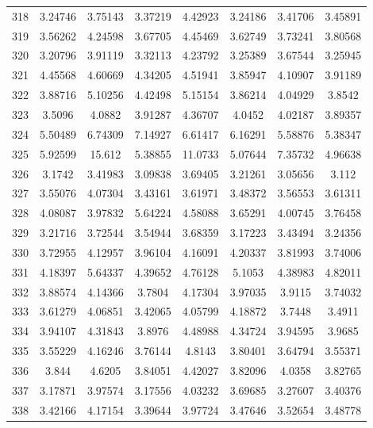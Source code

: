 \begin{center}
\begin{longtable}{cccccccc}
318 & 3.24746 & 3.75143 & 3.37219 & 4.42923 & 3.24186 & 3.41706 & 3.45891\\
319 & 3.56262 & 4.24598 & 3.67705 & 4.45469 & 3.62749 & 3.73241 & 3.80568\\
320 & 3.20796 & 3.91119 & 3.32113 & 4.23792 & 3.25389 & 3.67544 & 3.25945\\
321 & 4.45568 & 4.60669 & 4.34205 & 4.51941 & 3.85947 & 4.10907 & 3.91189\\
322 & 3.88716 & 5.10256 & 4.42498 & 5.15154 & 3.86214 & 4.04929 & 3.8542\\
323 & 3.5096 & 4.0882 & 3.91287 & 4.36707 & 4.0452 & 4.02187 & 3.89357\\
324 & 5.50489 & 6.74309 & 7.14927 & 6.61417 & 6.16291 & 5.58876 & 5.38347\\
325 & 5.92599 & 15.612 & 5.38855 & 11.0733 & 5.07644 & 7.35732 & 4.96638\\
326 & 3.1742 & 3.41983 & 3.09838 & 3.69405 & 3.21261 & 3.05656 & 3.112\\
327 & 3.55076 & 4.07304 & 3.43161 & 3.61971 & 3.48372 & 3.56553 & 3.61311\\
328 & 4.08087 & 3.97832 & 5.64224 & 4.58088 & 3.65291 & 4.00745 & 3.76458\\
329 & 3.21716 & 3.72544 & 3.54944 & 3.68359 & 3.17223 & 3.43494 & 3.24356\\
330 & 3.72955 & 4.12957 & 3.96104 & 4.16091 & 4.20337 & 3.81993 & 3.74006\\
331 & 4.18397 & 5.64337 & 4.39652 & 4.76128 & 5.1053 & 4.38983 & 4.82011\\
332 & 3.88574 & 4.14366 & 3.7804 & 4.17304 & 3.97035 & 3.9115 & 3.74032\\
333 & 3.61279 & 4.06851 & 3.42065 & 4.05799 & 4.18872 & 3.7448 & 3.4911\\
334 & 3.94107 & 4.31843 & 3.8976 & 4.48988 & 4.34724 & 3.94595 & 3.9685\\
335 & 3.55229 & 4.16246 & 3.76144 & 4.8143 & 3.80401 & 3.64794 & 3.55371\\
336 & 3.844 & 4.6205 & 3.84051 & 4.42027 & 3.82096 & 4.0358 & 3.82765\\
337 & 3.17871 & 3.97574 & 3.17556 & 4.03232 & 3.69685 & 3.27607 & 3.40376\\
338 & 3.42166 & 4.17154 & 3.39644 & 3.97724 & 3.47646 & 3.52654 & 3.48778\\
\end{longtable}
\end{center} 


